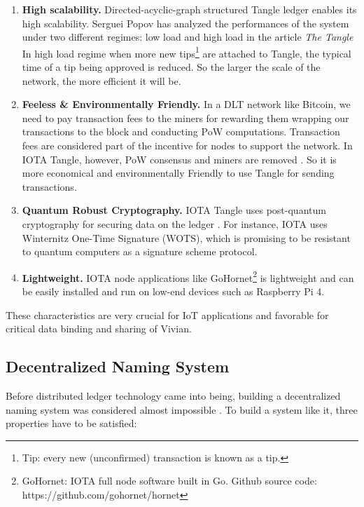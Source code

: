 \begin{enumerate}
    \item \textbf{High scalability.} Directed-acyclic-graph structured Tangle ledger enables its high scalability. Serguei Popov has analyzed the performances of the system under two different regimes: low load and high load in the article \textit{The Tangle} \cite{popov2015tangle} In high load regime when more new tips\footnote{Tip: every new (unconfirmed) transaction is known as a tip.} are attached to Tangle, the typical time of a tip being approved is reduced.
          So the larger the scale of the network, the more efficient it will be.
    \item \textbf{Feeless \& Environmentally Friendly.} In a DLT network like Bitcoin, we need to pay transaction fees to the miners for rewarding them wrapping our transactions to the block and conducting PoW computations. Transaction fees are considered part of the incentive for nodes to support the network. In IOTA Tangle, however, PoW consensus and miners are removed \cite{popov2019iota}. So it is more economical and environmentally Friendly to use Tangle for sending transactions.
    \item \textbf{Quantum Robust Cryptography.} IOTA Tangle uses post-quantum cryptography for securing data on the ledger \cite{tennant2017improving}. For instance, IOTA uses Winternitz One-Time Signature (WOTS), which is promising to be resistant to quantum computers \cite{buchmann2008post} as a signature scheme protocol.
    \item \textbf{Lightweight.} IOTA node applications like GoHornet\footnote{GoHornet: IOTA full node software built in Go. Github source code: https://github.com/gohornet/hornet} is lightweight and can be easily installed and run on low-end devices such as Raspberry Pi 4.
\end{enumerate}

These characteristics are very crucial for IoT applications and favorable for critical data binding and sharing of Vivian.


\subsection{Decentralized Naming System}
Before distributed ledger technology came into being, building a decentralized naming system was considered almost impossible \cite{swartz_2011}. To build a system like it, three properties have to be satisfied:

